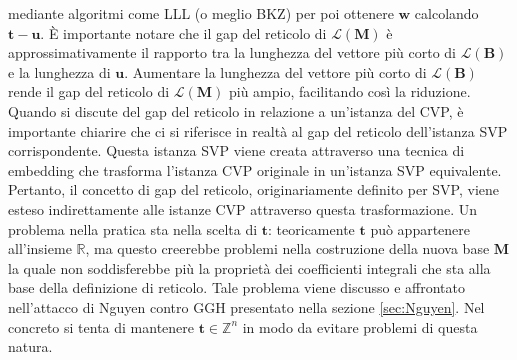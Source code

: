 mediante algoritmi come LLL (o meglio BKZ) per poi ottenere $\mathbf{w}$ calcolando 
$\mathbf{t}-\mathbf{u}$.
È importante notare che il gap del reticolo di $\mathcal{L}(\mathbf{M})$ è approssimativamente il 
rapporto tra la lunghezza del vettore più corto di $\mathcal{L}(\mathbf{B})$ e la lunghezza 
di $\mathbf{u}$. Aumentare la lunghezza del vettore più corto di 
$\mathcal{L}(\mathbf{B})$ rende il gap del reticolo di $\mathcal{L}(\mathbf{M})$ più ampio, 
facilitando così la riduzione.
Quando si discute del gap del reticolo in relazione a un'istanza del CVP, è 
importante chiarire che ci si riferisce in realtà al gap del reticolo dell'istanza SVP corrispondente. 
Questa istanza SVP viene creata attraverso una tecnica di embedding che trasforma l'istanza 
CVP originale in un'istanza SVP equivalente. Pertanto, il concetto di gap del reticolo, 
originariamente definito per SVP, viene esteso indirettamente alle istanze CVP attraverso 
questa trasformazione.
Un problema nella pratica sta nella scelta di $\mathbf{t}$: teoricamente
$\mathbf{t}$ può appartenere all'insieme $\mathbb{R}$, ma questo creerebbe problemi nella
costruzione della nuova base $\mathbf{M}$ la quale non soddisferebbe più la proprietà dei 
coefficienti integrali che sta alla base della definizione di reticolo. Tale problema viene
discusso e affrontato nell'attacco di Nguyen contro GGH presentato nella sezione \ref{sec:Nguyen}.
Nel concreto si tenta di mantenere $\mathbf{t} \in \mathbb{Z}^n$ in modo da evitare problemi
di questa natura.

